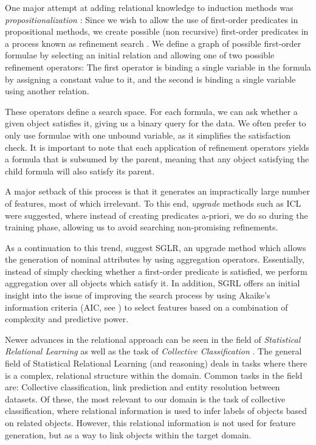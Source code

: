 \documentclass[12pt, a4paper]{article}
\theoremstyle{definition}
\begin{document}
One major attempt at adding relational knowledge to induction methods was \emph{propositionalization} \citep{kramer2000bottom}: Since we wish to allow the use of first-order predicates in propositional methods, we create possible (non recursive) first-order predicates in a process known as refinement search \citep{van1998completeness}.
We define a graph of possible first-order formulae by selecting an initial relation and allowing one of two possible refinement operators: The first operator is binding a single variable in the formula by assigning a constant value to it, and the second is binding a single variable using another relation.

These operators define a search space. For each formula, we can ask whether a given object satisfies it, giving us a binary query for the data. We often prefer to only use formulae with one unbound variable, as it simplifies the satisfaction check.
It is important to note that each application of refinement operators yields a formula that is subsumed by the parent, meaning that any object satisfying the child formula will also satisfy its parent.

A major setback of this process is that it generates an impractically large number of features, most of which irrelevant.  To this end, \emph{upgrade} methods such as ICL \citep{van2001upgrade} were suggested, where instead of creating predicates a-priori, we do so during the training phase, allowing us to avoid searching non-promising refinements.

As a continuation to this trend, \citet{popescul200716} suggest SGLR, an upgrade method which allows the generation of nominal attributes by using aggregation operators. Essentially, instead of simply checking whether a first-order predicate is satisfied, we perform aggregation over all objects which satisfy it. In addition, SGRL offers an initial insight into the issue of improving the search process by using Akaike's information criteria (AIC, see \citet{burnham2002model}) to select features based on a combination of complexity and predictive power.

Newer advances in the relational approach can be seen in the field of \emph{Statistical Relational Learning} \citep{blockeel2013statistical, nath2014learning} as well as the task of \emph{Collective Classification} \citep{laorden2012collective, kajdanowicz2013collective}. The general field of Statistical Relational Learning (and reasoning) deals in tasks where there is a complex, relational structure within the domain. Common tasks in the field are: Collective classification, link prediction and entity resolution between datasets. Of these, the most relevant to our domain is the task of collective classification, where relational information is used to infer labels of objects based on related objects. However, this relational information is not used for feature generation, but as a way to link objects within the target domain.
\end{document}
